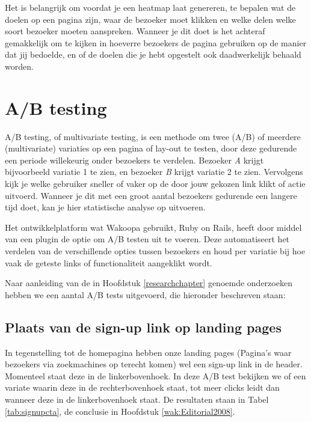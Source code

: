\documentclass[a4paper, 10pt, pdftex]{report}
\begin{document}
    Het is belangrijk om voordat je een heatmap laat genereren, te bepalen wat de doelen op een pagina zijn, waar de bezoeker moet klikken en welke delen welke soort bezoeker moeten aanspreken. Wanneer je dit doet is het achteraf gemakkelijk om te kijken in hoeverre bezoekers de pagina gebruiken op de manier dat jij bedoelde, en of de doelen die je hebt opgestelt ook daadwerkelijk behaald worden.


    \section{A/B testing}
    A/B testing, of multivariate testing, is een methode om twee (A/B) of meerdere (multivariate) variaties op een pagina of lay-out te testen, door deze gedurende een periode willekeurig onder bezoekers te verdelen. Bezoeker \emph{A} krijgt bijvoorbeeld variatie 1 te zien, en bezoeker \emph{B} krijgt variatie 2 te zien. Vervolgens kijk je welke gebruiker sneller of vaker op de door jouw gekozen link klikt of actie uitvoerd. Wanneer je dit met een groot aantal bezoekers gedurende een langere tijd doet, kan je hier statistische analyse op uitvoeren.

   Het ontwikkelplatform wat Wakoopa gebruikt, Ruby on Rails, heeft door middel van een plugin de optie om A/B testen uit te voeren. Deze automatiseert het verdelen van de verschillende opties tussen bezoekers en houd per variatie bij hoe vaak de geteste links of functionaliteit aangeklikt wordt.

    Naar aanleiding van de in Hoofdstuk \ref{researchchapter} genoemde onderzoeken hebben we een aantal A/B tests uitgevoerd, die hieronder beschreven staan:

    \subsection{Plaats van de sign-up link op landing pages}
      \label{ctatest}
      In tegenstelling tot de homepagina hebben onze landing pages (Pagina's waar bezoekers via zoekmachines op terecht komen) wel een sign-up link in de header. Momenteel staat deze in de linkerbovenhoek. In deze A/B test bekijken we of een variate waarin deze in de rechterbovenhoek staat, tot meer clicks leidt dan wanneer deze in de linkerbovenhoek staat. De resultaten staan in Tabel \ref{tab:signupcta}, de conclusie in Hoofdstuk \ref{wak:Editorial2008}.
\end{document}
